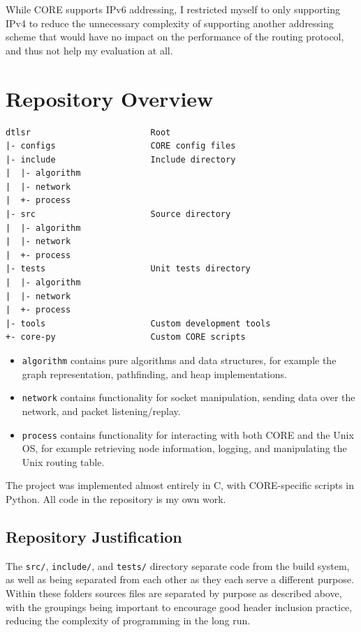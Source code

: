 \documentclass[withindex,glossary,openany]{cam-thesis}
\begin{document}
While CORE supports IPv6 addressing, I restricted myself to only supporting IPv4 to reduce the unnecessary complexity of supporting another addressing scheme that would have no impact on the performance of the routing protocol, and thus not help my evaluation at all.

\section{Repository Overview}

\begin{minipage}{1\textwidth} \centering
\begin{lstlisting}[label=repository, frame=tb]
dtlsr                        Root
|- configs                   CORE config files
|- include                   Include directory
|  |- algorithm
|  |- network
|  +- process
|- src                       Source directory
|  |- algorithm
|  |- network
|  +- process
|- tests                     Unit tests directory
|  |- algorithm
|  |- network
|  +- process
|- tools                     Custom development tools
+- core-py                   Custom CORE scripts
\end{lstlisting}
\end{minipage}

\begin{itemize}
	\item
	\texttt{algorithm} contains pure algorithms and data structures, for example the graph representation, pathfinding, and heap implementations.

	\item
	\texttt{network} contains functionality for socket manipulation, sending data over the network, and packet listening/replay.
	
	\item
	\texttt{process} contains functionality for interacting with both CORE and the Unix OS, for example retrieving node information, logging, and manipulating the Unix routing table.
\end{itemize}

The project was implemented almost entirely in C, with CORE-specific scripts in Python. All code in the repository is my own work.

\subsection{Repository Justification}

The \texttt{src/}, \texttt{include/}, and \texttt{tests/} directory separate code from the build system, as well as being separated from each other as they each serve a different purpose. Within these folders sources files are separated by purpose as described above, with the groupings being important to encourage good header inclusion practice, reducing the complexity of programming in the long run.
\end{document}
